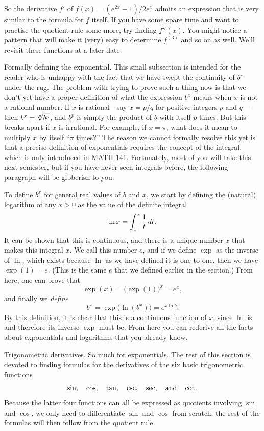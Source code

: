 So the derivative $f'$ of $f(x) = (e^{2x} - 1)/2e^x$ admits an expression that is very similar to the formula
for $f$ itself. If you have
some spare time and want to practise the quotient rule some more, try finding $f''(x)$. You might
notice a pattern that will make it (very) easy to determine $f^{(3)}$ and so on as well. We'll revisit
these functions at a later date.

\medskip\boldlabel \llap{*}Formally defining the exponential.
This small subsection is intended for the reader who is
unhappy with the fact that we have swept the continuity of $b^x$ under the rug.
The problem
with trying to prove such a thing now is that we don't yet have a proper definition of what the expression
$b^x$ means when $x$ is not a rational number.
If $x$ is
rational---say $x=p/q$ for positive integers $p$ and $q$---then $b^x = \root q\of{b^p}$, and $b^p$
is simply the product of $b$ with itself $p$ times. But this breaks apart if $x$ is irrational.
For example, if $x=\pi$, what does it mean to
multiply $x$ by itself ``$\pi$ times?''
The reason we cannot formally resolve this yet is that a precise definition of exponentials
requires the concept of the integral, which
is only introduced in {\mc MATH} 141.
Fortunately, most of you will take this next semester, but if you have never seen integrals before,
the following paragraph will be gibberish to you.

To define $b^x$ for general real values of $b$ and $x$, we start by
defining the (natural) logarithm of any $x>0$ as the value of the definite integral
$$\ln x = \int_1^x {1\over t} \,dt.$$
It can be shown that this is continuous, and
there is a unique number $x$ that makes this integral $x$. We call this number $e$, and if we define
$\exp$ as the inverse of $\ln$, which exists because $\ln$ as we have defined it is one-to-one,
then we have $\exp(1) = e$. (This is the same $e$ that we defined earlier in the section.)
From here, one can prove that
$$\exp(x) = \bigl(\exp(1)\bigr)^x = e^x,$$
and finally we {\it define}
$$b^x = \exp\bigl(\ln(b^x)\bigr) =  e^{ x\ln b}.$$
By this definition, it is clear that this is a continuous function of $x$, since $\ln$ is and therefore
its inverse $\exp$ must be. From here you can rederive all the facts about exponentials and logarithms
that you already know.

\medskip\boldlabel Trigonometric derivatives.
So much for exponentials.
The rest of this section is devoted to finding
formulas for the derivatives of the six basic trigonometric functions
$$\sin,\quad\cos,\quad\tan,\quad\csc,\quad\sec,\quad\hbox{and}\quad\cot.$$
Because the latter four functions can all be expressed as quotients involving $\sin$ and $\cos$, we only
need to differentiate $\sin$ and $\cos$ from scratch; the rest of the formulas will then follow from the
quotient rule.


